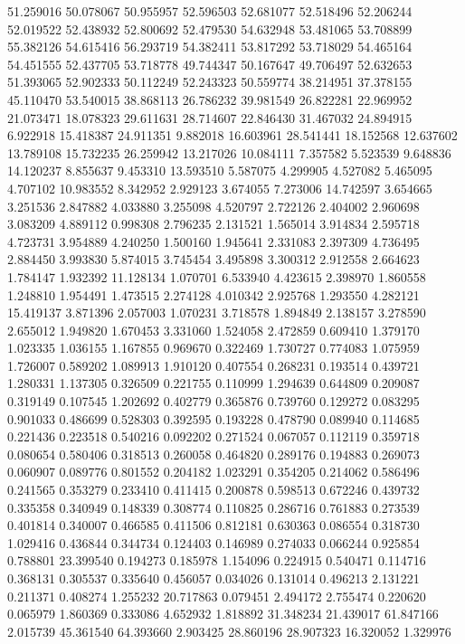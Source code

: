 51.259016
50.078067
50.955957
52.596503
52.681077
52.518496
52.206244
52.019522
52.438932
52.800692
52.479530
54.632948
53.481065
53.708899
55.382126
54.615416
56.293719
54.382411
53.817292
53.718029
54.465164
54.451555
52.437705
53.718778
49.744347
50.167647
49.706497
52.632653
51.393065
52.902333
50.112249
52.243323
50.559774
38.214951
37.378155
45.110470
53.540015
38.868113
26.786232
39.981549
26.822281
22.969952
21.073471
18.078323
29.611631
28.714607
22.846430
31.467032
24.894915
6.922918
15.418387
24.911351
9.882018
16.603961
28.541441
18.152568
12.637602
13.789108
15.732235
26.259942
13.217026
10.084111
7.357582
5.523539
9.648836
14.120237
8.855637
9.453310
13.593510
5.587075
4.299905
4.527082
5.465095
4.707102
10.983552
8.342952
2.929123
3.674055
7.273006
14.742597
3.654665
3.251536
2.847882
4.033880
3.255098
4.520797
2.722126
2.404002
2.960698
3.083209
4.889112
0.998308
2.796235
2.131521
1.565014
3.914834
2.595718
4.723731
3.954889
4.240250
1.500160
1.945641
2.331083
2.397309
4.736495
2.884450
3.993830
5.874015
3.745454
3.495898
3.300312
2.912558
2.664623
1.784147
1.932392
11.128134
1.070701
6.533940
4.423615
2.398970
1.860558
1.248810
1.954491
1.473515
2.274128
4.010342
2.925768
1.293550
4.282121
15.419137
3.871396
2.057003
1.070231
3.718578
1.894849
2.138157
3.278590
2.655012
1.949820
1.670453
3.331060
1.524058
2.472859
0.609410
1.379170
1.023335
1.036155
1.167855
0.969670
0.322469
1.730727
0.774083
1.075959
1.726007
0.589202
1.089913
1.910120
0.407554
0.268231
0.193514
0.439721
1.280331
1.137305
0.326509
0.221755
0.110999
1.294639
0.644809
0.209087
0.319149
0.107545
1.202692
0.402779
0.365876
0.739760
0.129272
0.083295
0.901033
0.486699
0.528303
0.392595
0.193228
0.478790
0.089940
0.114685
0.221436
0.223518
0.540216
0.092202
0.271524
0.067057
0.112119
0.359718
0.080654
0.580406
0.318513
0.260058
0.464820
0.289176
0.194883
0.269073
0.060907
0.089776
0.801552
0.204182
1.023291
0.354205
0.214062
0.586496
0.241565
0.353279
0.233410
0.411415
0.200878
0.598513
0.672246
0.439732
0.335358
0.340949
0.148339
0.308774
0.110825
0.286716
0.761883
0.273539
0.401814
0.340007
0.466585
0.411506
0.812181
0.630363
0.086554
0.318730
1.029416
0.436844
0.344734
0.124403
0.146989
0.274033
0.066244
0.925854
0.788801
23.399540
0.194273
0.185978
1.154096
0.224915
0.540471
0.114716
0.368131
0.305537
0.335640
0.456057
0.034026
0.131014
0.496213
2.131221
0.211371
0.408274
1.255232
20.717863
0.079451
2.494172
2.755474
0.220620
0.065979
1.860369
0.333086
4.652932
1.818892
31.348234
21.439017
61.847166
2.015739
45.361540
64.393660
2.903425
28.860196
28.907323
16.320052
1.329976
